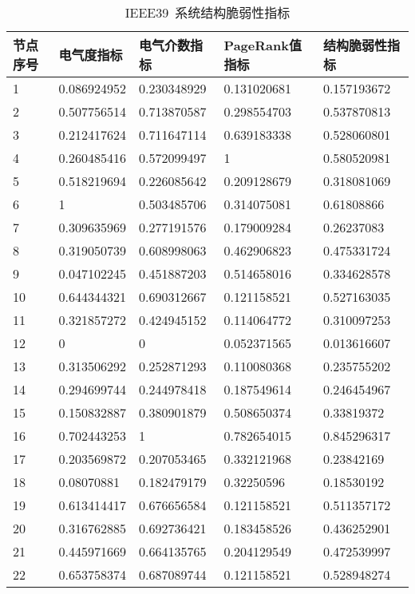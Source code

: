 \begin{table}[H]
  \centering
  \caption{IEEE39~系统结构脆弱性指标}
  \label{tab:chap5:Index_frabric39}
  \begin{tabular}{C{1.5cm}C{2.75cm}C{2.75cm}C{3.25cm}C{2.75cm}}
  \toprule
  \textbf{节点序号} & \textbf{电气度指标} & \textbf{电气介数指标} & \textbf{PageRank值指标} & \textbf{结构脆弱性指标} \\
   & 0.086924952 & 0.230348929 & 0.131020681 & 0.157193672 \\ 
  2 & 0.507756514 & 0.713870587 & 0.298554703 & 0.537870813 \\ 
  3 & 0.212417624 & 0.711647114 & 0.639183338 & 0.528060801 \\ 
  4 & 0.260485416 & 0.572099497 & 1 & 0.580520981 \\ 
  5 & 0.518219694 & 0.226085642 & 0.209128679 & 0.318081069 \\ 
  6 & 1 & 0.503485706 & 0.314075081 & 0.61808866 \\
  7 & 0.309635969 & 0.277191576 & 0.179009284 & 0.26237083 \\ 
  8 & 0.319050739 & 0.608998063 & 0.462906823 & 0.475331724 \\ 
  9 & 0.047102245 & 0.451887203 & 0.514658016 & 0.334628578 \\ 
  10 & 0.644344321 & 0.690312667 & 0.121158521 & 0.527163035 \\ 
  11 & 0.321857272 & 0.424945152 & 0.114064772 & 0.310097253 \\ 
  12 & 0 & 0 & 0.052371565 & 0.013616607 \\
  13 & 0.313506292 & 0.252871293 & 0.110080368 & 0.235755202 \\ 
  14 & 0.294699744 & 0.244978418 & 0.187549614 & 0.246454967 \\ 
  15 & 0.150832887 & 0.380901879 & 0.508650374 & 0.33819372 \\ 
  16 & 0.702443253 & 1 & 0.782654015 & 0.845296317 \\ 
  17 & 0.203569872 & 0.207053465 & 0.332121968 & 0.23842169 \\ 
  18 & 0.08070881 & 0.182479179 & 0.32250596 & 0.18530192 \\ 
  19 & 0.613414417 & 0.676656584 & 0.121158521 & 0.511357172 \\ 
  20 & 0.316762885 & 0.692736421 & 0.183458526 & 0.436252901 \\ 
  21 & 0.445971669 & 0.664135765 & 0.204129549 & 0.472539997 \\ 
  22 & 0.653758374 & 0.687089744 & 0.121158521 & 0.528948274 \\ 

\end{tabular}
\end{table}
